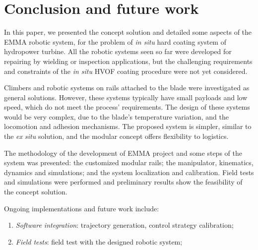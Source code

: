 \section{Conclusion and future work}

In this paper, we presented the concept solution and detailed some
aspects of the EMMA robotic system, for the problem of \textit{in situ} hard
coating system of hydropower turbine. All the robotic systems seen so far were
developed for repairing by wielding or inspection applications, but the
challenging requirements and constraints of the \textit{in situ} HVOF coating
procedure were not yet considered.

Climbers and robotic systems on rails attached to the blade were investigated as
general solutions. However, these systems typically have small payloads and
low speed, which do not meet the process' requirements. The design of these systems
would be very complex, due to the blade's temperature variation, and the
locomotion and adhesion mechanisms. The proposed system is simpler, similar to
the \textit{ex situ} solution, and the modular concept offers flexibility to
logistics.

The methodology of the development of EMMA project and some steps
of the system was presented: the customized modular rails; the manipulator,
kinematics, dynamics and simulations; and the system localization and
calibration. Field tests and simulations were performed and
preliminary results show the feasibility of the concept solution.

Ongoing implementations and future work include:
\begin{enumerate}
  	\item \textit{Software integration}: trajectory generation, control strategy
  	calibration;
  	\item \textit{Field tests}: field test with the designed robotic system;
\end{enumerate}